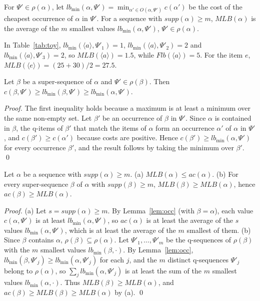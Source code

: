 \documentclass[runningheads]{llncs}
\newcommand{\flb}{\ensuremath{\mathit{Flb}}}
\newcommand{\mlb}{\ensuremath{\mathit{MLB}}}
\newcommand{\supp}{\ensuremath{\mathit{supp}}}
\newcommand{\ac}{\ensuremath{\mathit{ac}}}
\newcommand{\lbmin}{\ensuremath{\mathit{lb}_{\min}}}
\newcommand{\seq}[1]{\langle #1\rangle}
\begin{document}
\begin{definition}[MLB]
For $\Psi' \in \rho(\alpha)$, let $\lbmin(\alpha,\Psi') = \min_{\alpha' \in O(\alpha,\Psi')}
c(\alpha')$ be the cost of the cheapest occurrence of $\alpha$ in $\Psi'$. For a sequence with
$\supp(\alpha) \ge m$, $\mlb(\alpha)$ is the average of the $m$ smallest values
$\lbmin(\alpha,\Psi')$, $\Psi' \in \rho(\alpha)$.
\end{definition}

\begin{example}
In Table~\ref{tab:toy}, $\lbmin(\seq{a},\Psi'_1) = 1$, $\lbmin(\seq{a},\Psi'_2) = 2$ and
$\lbmin(\seq{a},\Psi'_3) = 2$, so $\mlb(\seq{a}) = 1.5$, while $\flb(\seq{a}) = 5$.
For the item $e$, $\mlb(\seq{e}) = (25 + 30)/2 = 27.5$.
\end{example}

\begin{lemma}\label{lem:occ}
Let $\beta$ be a super-sequence of $\alpha$ and $\Psi' \in \rho(\beta)$. Then
$c(\beta,\Psi') \ge \lbmin(\beta,\Psi') \ge \lbmin(\alpha,\Psi')$.
\end{lemma}
\begin{proof}
The first inequality holds because a maximum is at least a minimum over the same non-empty set.
Let $\beta'$ be an occurrence of $\beta$ in $\Psi'$. Since $\alpha$ is contained in $\beta$,
the q-items of $\beta'$ that match the items of $\alpha$ form an occurrence $\alpha'$ of
$\alpha$ in $\Psi'$, and $c(\beta') \ge c(\alpha')$ because costs are positive. Hence
$c(\beta') \ge \lbmin(\alpha,\Psi')$ for every occurrence $\beta'$, and the result follows by
taking the minimum over $\beta'$. \qed
\end{proof}

\begin{theorem}\label{thm:mlb}
Let $\alpha$ be a sequence with $\supp(\alpha) \ge m$.
(a) $\mlb(\alpha) \le \ac(\alpha)$.
(b) For every super-sequence $\beta$ of $\alpha$ with $\supp(\beta) \ge m$,
$\mlb(\beta) \ge \mlb(\alpha)$, hence $\ac(\beta) \ge \mlb(\alpha)$.
\end{theorem}
\begin{proof}
(a) Let $s = \supp(\alpha) \ge m$. By Lemma~\ref{lem:occ} (with $\beta = \alpha$), each value
$c(\alpha,\Psi')$ is at least $\lbmin(\alpha,\Psi')$, so $\ac(\alpha)$ is at least the average
of the $s$ values $\lbmin(\alpha,\Psi')$, which is at least the average of the $m$ smallest
of them.
(b) Since $\beta$ contains $\alpha$, $\rho(\beta) \subseteq \rho(\alpha)$. Let
$\Psi'_{1}, \dots, \Psi'_{m}$ be the q-sequences of $\rho(\beta)$ with the $m$ smallest values
$\lbmin(\beta,\cdot)$. By Lemma~\ref{lem:occ}, $\lbmin(\beta,\Psi'_j) \ge
\lbmin(\alpha,\Psi'_j)$ for each $j$, and the $m$ distinct q-sequences $\Psi'_j$ belong to
$\rho(\alpha)$, so $\sum_j \lbmin(\alpha,\Psi'_j)$ is at least the sum of the $m$ smallest
values $\lbmin(\alpha,\cdot)$. Thus $\mlb(\beta) \ge \mlb(\alpha)$, and
$\ac(\beta) \ge \mlb(\beta) \ge \mlb(\alpha)$ by (a). \qed
\end{proof}
\end{document}
